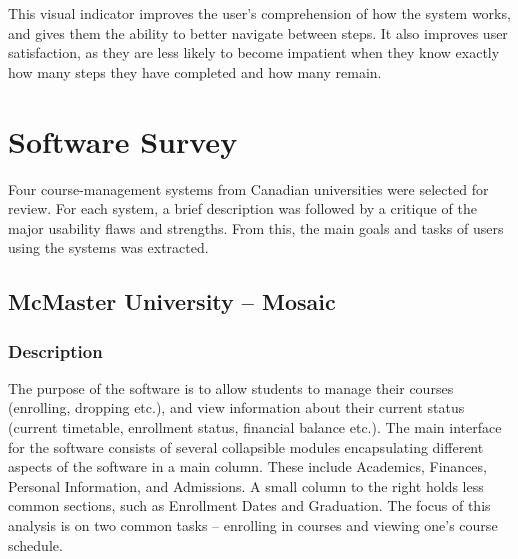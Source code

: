 \documentclass[10pt]{article}
\newenvironment{InlineColumnFigure}
{\par\medskip\noindent\minipage{\linewidth}}
{\endminipage\par\medskip}
\newcommand{\Caption}[1]
{\vspace{-4mm}\fontsize{9}{9}\textbf{Figure \refstepcounter{figCounter} 
\arabic{figCounter}: #1}}
\newcounter{figCounter}
\begin{document}
\begin{multicols}{2}
This visual indicator improves the user's comprehension of how the system 
works, and gives them the ability to better navigate between steps. It also improves user satisfaction, 
as they are less likely to become impatient when they know exactly 
how many steps they have completed and how many remain. 

\section*{Software Survey}
Four course-management systems from Canadian universities were selected for 
review. For each system, a brief description was followed by a critique of 
the major usability flaws and strengths. From this, the main goals and tasks of 
users using the systems was extracted. 


\subsection*{McMaster University -- Mosaic}

\subsubsection*{Description}
The purpose of the software is to allow students to manage their courses 
(enrolling, dropping etc.), and view information about their current status 
(current timetable, enrollment status, financial balance etc.). The main 
interface for the software consists of several collapsible modules 
encapsulating different aspects of the software in a main column. These include 
Academics, Finances, Personal Information, and Admissions. A small column to 
the right holds less common sections, such as Enrollment Dates and Graduation. 
The focus of this analysis is on two common tasks -- enrolling in courses and 
viewing one's course schedule.



\end{multicols}
\end{document}

